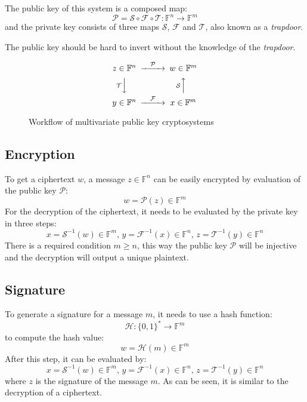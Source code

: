 \documentclass[thesis=M,english]{FITthesis}[2019/12/23]
\begin{document}
The public key of this system is a composed map:
\[
\mathcal{P} = \mathcal{S} \circ \mathcal{F} \circ \mathcal{T} : \mathbb{F}^n \rightarrow \mathbb{F}^m
\]
and the private key consists of three maps $\mathcal{S}$, $\mathcal{F}$ and $\mathcal{T}$, also known as a \textit{trapdoor}.

The public key should be hard to invert without the knowledge of the \textit{trapdoor}.

\begin{figure}[h]
\begin{equation*}
\begin{CD}
z \in \mathbb{F}^n @> \mathcal{P} >> w \in \mathbb{F}^m \\
@V\mathcal{T}VV @A\mathcal{S}AA \\
y \in \mathbb{F}^n @> \mathcal{F} >> x \in \mathbb{F}^m
\end{CD}
\end{equation*}
\caption{Workflow of multivariate public key cryptosystems}
\end{figure}
\smallskip

\subsection{Encryption}
To get a ciphertext $w$, a message $z \in \mathbb{F}^n$ can be easily encrypted by evaluation of the public key $\mathcal{P}$:
\[
w = \mathcal{P}(z) \in \mathbb{F}^m
\]
For the decryption of the ciphertext, it needs to be evaluated by the private key in three steps:
\[
x = \mathcal{S}^{-1}(w) \in \mathbb{F}^m, \, y = \mathcal{F}^{-1}(x) \in \mathbb{F}^n, \, z = \mathcal{T}^{-1}(y) \in \mathbb{F}^n
\]
There is a required condition $m \geq n$, this way the public key $\mathcal{P}$ will be injective and the decryption will output a unique plaintext.

\subsection{Signature}
To generate a signature for a message $m$, it needs to use a hash function:
\[
\mathcal{H}: \{0,1\}^{*} \rightarrow \mathbb{F}^m
\]
to compute the hash value:
\[
w = \mathcal{H}(m) \in \mathbb{F}^m
\]
After this step, it can be evaluated by:
\[
x = \mathcal{S}^{-1}(w) \in \mathbb{F}^m, \, y = \mathcal{F}^{-1}(x) \in \mathbb{F}^n, \, z = \mathcal{T}^{-1}(y) \in \mathbb{F}^n
\]
where $z$ is the signature of the message $m$. As can be seen, it is similar to the decryption of a ciphertext.
\end{document}
